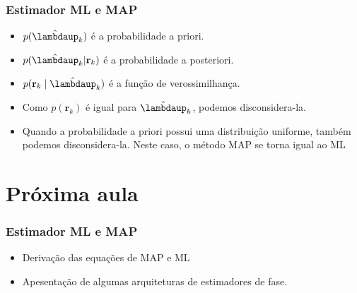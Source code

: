\begin{frame}[t]
    \frametitle{Estimador ML e MAP}

    \begin{itemize}
        \item \(p(\hat{\boldsymbol{\lambdaup}}_k)\) é a probabilidade a priori.
        \item \(p(\hat{\boldsymbol{\lambdaup}}_k | \mathbf{r}_k)\) é a probabilidade a posteriori.
        \item \(p(\mathbf{r}_k \mid \hat{\boldsymbol{\lambdaup}}_k)\) é a função de verossimilhança.
    \end{itemize}

    \begin{itemize}
        \item Como \(p(\mathbf{r}_k)\) é igual para \(\hat{\boldsymbol{\lambdaup}}_k\), podemos disconsidera-la.
        \item Quando a probabilidade a priori possui uma distribuição uniforme, também podemos disconsidera-la. Neste caso, o método MAP se torna igual ao ML
    \end{itemize}
\end{frame}

\section{Próxima aula}
\begin{frame}[t]
    \frametitle{Estimador ML e MAP}

    \begin{itemize}
        \item Derivação das equações de MAP e ML
        \item Apesentação de algumas arquiteturas de estimadores de fase.
    \end{itemize}
\end{frame}
